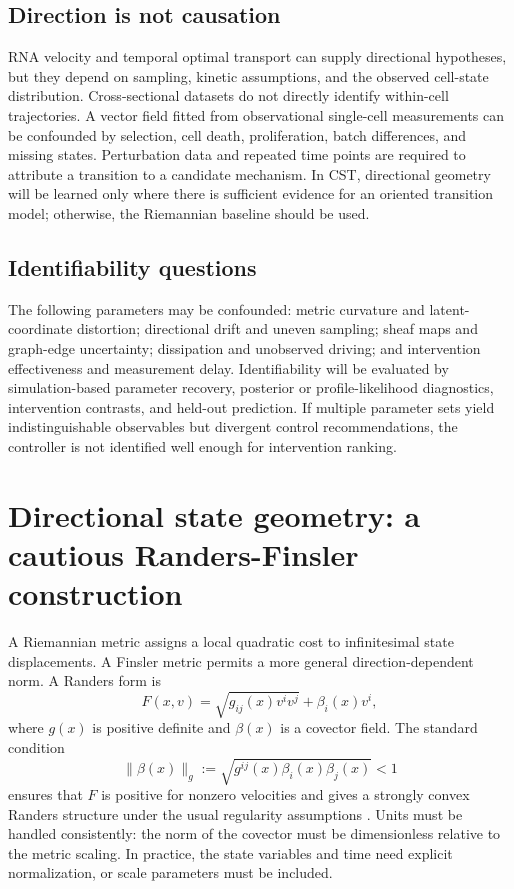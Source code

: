 \documentclass[11pt,a4paper]{article}
\theoremstyle{definition}
\theoremstyle{remark}
\begin{document}
\subsection{Direction is not causation}
RNA velocity and temporal optimal transport can supply directional hypotheses, but they depend on sampling, kinetic assumptions, and the observed cell-state distribution. Cross-sectional datasets do not directly identify within-cell trajectories. A vector field fitted from observational single-cell measurements can be confounded by selection, cell death, proliferation, batch differences, and missing states. Perturbation data and repeated time points are required to attribute a transition to a candidate mechanism. In CST, directional geometry will be learned only where there is sufficient evidence for an oriented transition model; otherwise, the Riemannian baseline should be used.

\subsection{Identifiability questions}
The following parameters may be confounded: metric curvature and latent-coordinate distortion; directional drift and uneven sampling; sheaf maps and graph-edge uncertainty; dissipation and unobserved driving; and intervention effectiveness and measurement delay. Identifiability will be evaluated by simulation-based parameter recovery, posterior or profile-likelihood diagnostics, intervention contrasts, and held-out prediction. If multiple parameter sets yield indistinguishable observables but divergent control recommendations, the controller is not identified well enough for intervention ranking.

\section{Directional state geometry: a cautious Randers-Finsler construction}
A Riemannian metric assigns a local quadratic cost to infinitesimal state displacements. A Finsler metric permits a more general direction-dependent norm. A Randers form is
\begin{equation}
F(x,v)=\sqrt{g_{ij}(x)v^iv^j}+\beta_i(x)v^i,
\label{eq:randers}
\end{equation}
where $g(x)$ is positive definite and $\beta(x)$ is a covector field. The standard condition
\begin{equation}
\|\beta(x)\|_{g}:=\sqrt{g^{ij}(x)\beta_i(x)\beta_j(x)}<1
\label{eq:randers_cond}
\end{equation}
ensures that $F$ is positive for nonzero velocities and gives a strongly convex Randers structure under the usual regularity assumptions \cite{Bao2000,Shen2001}. Units must be handled consistently: the norm of the covector must be dimensionless relative to the metric scaling. In practice, the state variables and time need explicit normalization, or scale parameters must be included.
\end{document}
